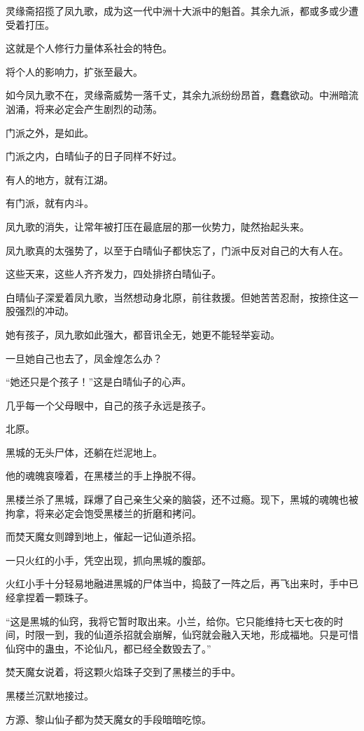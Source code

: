 \begin{this_body}
灵缘斋招揽了凤九歌，成为这一代中洲十大派中的魁首。其余九派，都或多或少遭受着打压。

这就是个人修行力量体系社会的特色。

将个人的影响力，扩张至最大。

如今凤九歌不在，灵缘斋威势一落千丈，其余九派纷纷昂首，蠢蠢欲动。中洲暗流汹涌，将来必定会产生剧烈的动荡。

门派之外，是如此。

门派之内，白晴仙子的日子同样不好过。

有人的地方，就有江湖。

有门派，就有内斗。

凤九歌的消失，让常年被打压在最底层的那一伙势力，陡然抬起头来。

凤九歌真的太强势了，以至于白晴仙子都快忘了，门派中反对自己的大有人在。

这些天来，这些人齐齐发力，四处排挤白晴仙子。

白晴仙子深爱着凤九歌，当然想动身北原，前往救援。但她苦苦忍耐，按捺住这一股强烈的冲动。

她有孩子，凤九歌如此强大，都音讯全无，她更不能轻举妄动。

一旦她自己也去了，凤金煌怎么办？

“她还只是个孩子！”这是白晴仙子的心声。

几乎每一个父母眼中，自己的孩子永远是孩子。

北原。

黑城的无头尸体，还躺在烂泥地上。

他的魂魄哀嚎着，在黑楼兰的手上挣脱不得。

黑楼兰杀了黑城，踩爆了自己亲生父亲的脑袋，还不过瘾。现下，黑城的魂魄也被拘拿，将来必定会饱受黑楼兰的折磨和拷问。

而焚天魔女则蹲到地上，催起一记仙道杀招。

一只火红的小手，凭空出现，抓向黑城的腹部。

火红小手十分轻易地融进黑城的尸体当中，捣鼓了一阵之后，再飞出来时，手中已经拿捏着一颗珠子。

“这是黑城的仙窍，我将它暂时取出来。小兰，给你。它只能维持七天七夜的时间，时限一到，我的仙道杀招就会崩解，仙窍就会融入天地，形成福地。只是可惜仙窍中的蛊虫，不论仙凡，都已经全数毁去了。”

焚天魔女说着，将这颗火焰珠子交到了黑楼兰的手中。

黑楼兰沉默地接过。

方源、黎山仙子都为焚天魔女的手段暗暗吃惊。


\end{this_body}
